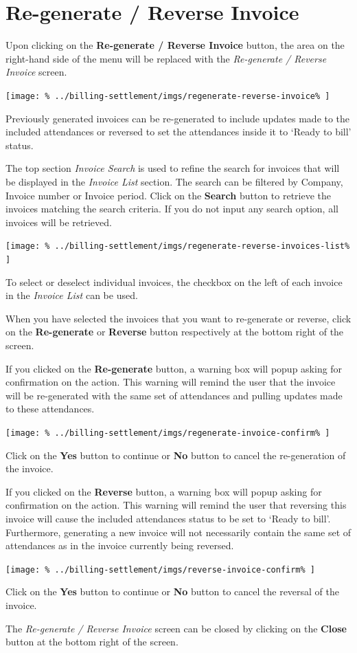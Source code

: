 \documentclass[../main/main]{subfiles}
\begin{document}
\newpage
\section{Re-generate / Reverse Invoice}
\label{sec:re-generate-reverse-invoice}

Upon clicking on the \textbf{Re-generate / Reverse Invoice} button,
the area on the right-hand side of the menu will be replaced with the
\emph{Re-generate / Reverse Invoice} screen.

\texttt{[image: \%
  ../billing-settlement/imgs/regenerate-reverse-invoice\%
]}

Previously generated invoices can be re-generated to include updates made to the
included attendances or reversed to set the attendances inside it to `Ready to
bill' status.

The top section \emph{Invoice Search} is used to refine the search for invoices
that will be displayed in the \emph{Invoice List} section.
The search can be filtered by Company, Invoice number or Invoice period.
Click on the \textbf{Search} button to retrieve the invoices matching the search
criteria. If you do not input any search option, all invoices will be retrieved.

\texttt{[image: \%
  ../billing-settlement/imgs/regenerate-reverse-invoices-list\%
]}

To select or deselect individual invoices, the checkbox on the left of each
invoice in the \emph{Invoice List} can be used.

When you have selected the invoices that you want to re-generate or reverse,
click on the \textbf{Re-generate} or \textbf{Reverse} button respectively at the
bottom right of the screen.

If you clicked on the \textbf{Re-generate} button, a warning box will popup
asking for confirmation on the action. This warning will remind the user that
the invoice will be re-generated with the same set of attendances and pulling
updates made to these attendances.

\texttt{[image: \%
  ../billing-settlement/imgs/regenerate-invoice-confirm\%
]}

Click on the \textbf{Yes} button to continue or \textbf{No} button to cancel
the re-generation of the invoice.

If you clicked on the \textbf{Reverse} button, a warning box will popup asking
for confirmation on the action. This warning will remind the user that reversing
this invoice will cause the included attendances status to be set to `Ready to
bill'. Furthermore, generating a new invoice will not necessarily contain the
same set of attendances as in the invoice currently being reversed.

\texttt{[image: \%
  ../billing-settlement/imgs/reverse-invoice-confirm\%
]}

Click on the \textbf{Yes} button to continue or \textbf{No} button to cancel
the reversal of the invoice.

The \emph{Re-generate / Reverse Invoice} screen can be closed by clicking on the
\textbf{Close} button at the bottom right of the screen.
\end{document}
